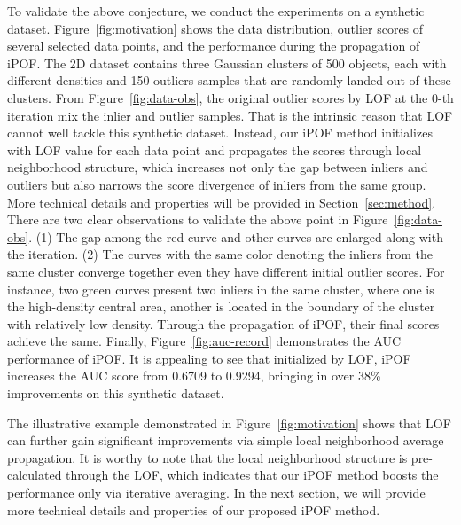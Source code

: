 \documentclass[sigconf,nonacm]{acmart}
\begin{document}
To validate the above conjecture, we conduct the experiments on a synthetic dataset. Figure\textcolor{red}{~\ref{fig:motivation}} shows the data distribution, outlier scores of several selected data points, and the performance during the propagation of iPOF. The 2D dataset contains three Gaussian clusters of 500 objects, each with different densities and 150 outliers samples that are randomly landed out of these clusters. From Figure\textcolor{red}{~\ref{fig:data-obs}}, the original outlier scores by LOF at the $0$-th iteration mix the inlier and outlier samples. That is the intrinsic reason that LOF cannot well tackle this synthetic dataset. Instead, our iPOF method initializes with LOF value for each data point and propagates the scores through local neighborhood structure, which increases not only the gap between inliers and outliers but also narrows the score divergence of inliers from the same group. More technical details and properties will be provided in Section\textcolor{red}{~\ref{sec:method}}. There are two clear observations to validate the above point in Figure\textcolor{red}{~\ref{fig:data-obs}}. (1) The gap among the red curve and other curves are enlarged along with the iteration. (2) The curves with the same color denoting the inliers from the same cluster converge together even they have different initial outlier scores. For instance, two green curves present two inliers in the same cluster, where one is the high-density central area, another is located in the boundary of the cluster with relatively low density. Through the propagation of iPOF, their final scores achieve the same. Finally, Figure\textcolor{red}{~\ref{fig:auc-record}} demonstrates the AUC performance of iPOF. It is appealing to see that initialized by LOF, iPOF increases the AUC score from 0.6709 to 0.9294, bringing in over 38\% improvements on this synthetic dataset.

The illustrative example demonstrated in Figure\textcolor{red}{~\ref{fig:motivation}} shows that LOF can further gain significant improvements via simple local neighborhood average propagation. It is worthy to note that the local neighborhood structure is pre-calculated through the LOF, which indicates that our iPOF method boosts the performance only via iterative averaging. In the next section, we will provide more technical details and properties of our proposed iPOF method.
\end{document}

